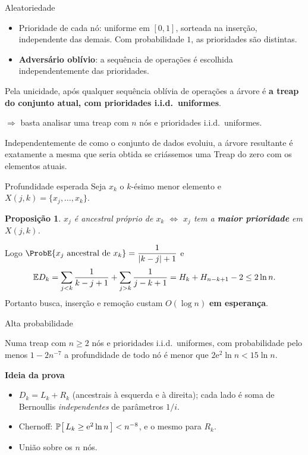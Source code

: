 \documentclass[aspectratio=169,11pt]{beamer}
\newtheorem{proposicao}[teorema]{Proposição}
\theoremstyle{definition}
\begin{document}
\begin{frame}{Aleatoriedade}
  \begin{itemize}
  \item Prioridade de cada nó: uniforme em $[0,1]$, sorteada na
    inserção, independente das demais. Com probabilidade $1$, as
    prioridades são distintas.
  \item \textbf{Adversário oblívio}: a sequência de operações é
    escolhida independentemente das prioridades.
  \end{itemize}
  \pause Pela \alert{unicidade}, após qualquer sequência oblívia de
  operações a árvore é \textbf{a treap do conjunto atual, com
    prioridades i.i.d.\ uniformes}.

  $\Rightarrow$ basta analisar uma treap com $n$ nós e prioridades
  i.i.d.\ uniformes.

  \pause

  Independentemente de como o conjunto de dados evoluiu, a árvore
  resultante é exatamente a mesma que seria obtida se criássemos uma
  Treap do zero com os elementos atuais.

  
\end{frame}

\begin{frame}{Profundidade esperada}
  Seja $x_k$ o $k$-ésimo menor elemento e $X(j,k)=\{x_j,\dots,x_k\}$.
  \begin{proposicao}
    $x_j$ é ancestral próprio de $x_k$ $\iff$ $x_j$ tem a
    \textbf{maior prioridade} em $X(j,k)$.
  \end{proposicao}
  \pause
  Logo $\ProbE{x_j \text{ ancestral de } x_k}=\dfrac1{|k-j|+1}$ e
  \[
    \mathbb{E}{D_k}=\sum_{j<k}\frac1{k-j+1}+\sum_{j>k}\frac1{j-k+1}
    =H_k+H_{n-k+1}-2\le 2\ln n .
  \]
  \pause
  Portanto busca, inserção e remoção custam $O(\log n)$ \textbf{em
    esperança}.
\end{frame}

\begin{frame}{Alta probabilidade}
  \begin{theorem}
    Numa treap com $n\ge2$ nós e prioridades i.i.d.\ uniformes, com
    probabilidade pelo menos $1-2n^{-7}$ a profundidade de todo nó é
    menor que $2\mathrm e^2\ln n<15\ln n$.
  \end{theorem}
  \pause
  \textbf{Ideia da prova}
  \begin{itemize}
  \item $D_k=L_k+R_k$ (ancestrais à esquerda e à direita); cada lado é
    soma de Bernoullis \emph{independentes} de parâmetros $1/i$.
  \item Chernoff: $\ProbE{L_k\ge \mathrm e^2\ln n}<n^{-8}$,
    e o mesmo para $R_k$.
  \item União sobre os $n$ nós.
  \end{itemize}
\end{frame}
\end{document}
